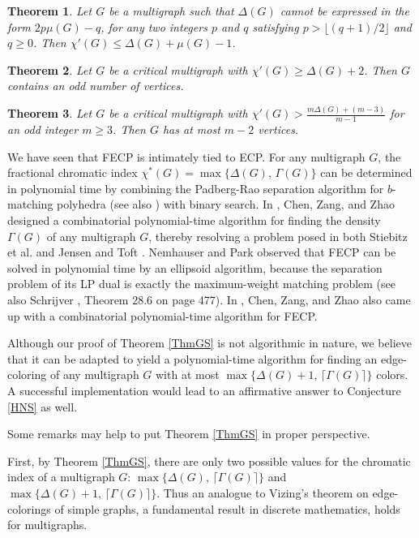 \documentclass[11pt]{article}
\newtheorem{theorem}{Theorem}[section]
\begin{document}
\begin{theorem} \label{ThmGupta67} 
Let $G$ be a multigraph such that $\Delta(G)$ cannot be expressed in the form $2p\mu(G)-q$,
for any two integers $p$ and $q$ satisfying $p > \lfloor (q+1)/2 \rfloor$ and $q \ge 0$. Then 
$\chi'(G)\le \Delta(G)+\mu(G)-1$. 
\end{theorem}

\begin{theorem} \label{ThmAnd0} 
Let $G$ be a critical multigraph with $\chi'(G) \ge \Delta(G)+2$. Then $G$ contains an odd number of
vertices.
\end{theorem}

\begin{theorem} \label{ThmAnd} 
Let $G$ be a critical multigraph with $\chi'(G)>\frac{m \Delta(G)+(m-3)}{m-1}$ for an odd 
integer $m \ge 3$. Then $G$ has at most $m-2$ vertices.
\end{theorem}

We have seen that FECP is intimately tied to ECP. For any multigraph $G$, the fractional chromatic index 
$\chi^*(G)=\max\{\Delta(G), \,\Gamma(G) \}$ can be determined in polynomial time 
by combining the Padberg-Rao separation algorithm for $b$-matching polyhedra \cite{PR} (see also \cite{LRT, PW}) with 
binary search. In \cite{CZZ}, Chen, Zang, and Zhao designed a combinatorial polynomial-time algorithm for finding 
the density $\Gamma(G)$ of any multigraph $G$, thereby resolving a problem posed in both Stiebitz et al. \cite{SSTF} 
and Jensen and Toft \cite{JT}. Nemhauser and Park \cite{NP} observed that FECP can be solved in polynomial 
time by an ellipsoid algorithm, because the separation problem of its LP dual is exactly the maximum-weight 
matching problem (see also Schrijver \cite{Sc}, Theorem 28.6 on page 477). In \cite{CZZ}, 
Chen, Zang, and Zhao also came up with a combinatorial polynomial-time algorithm for FECP.
 
Although our proof of Theorem \ref{ThmGS} is not algorithmic in nature, we believe that it can be adapted to 
yield a polynomial-time algorithm for finding an edge-coloring of any multigraph $G$ with at most 
$\max\{\Delta(G)+1, \, \lceil \Gamma(G) \rceil\}$ colors. A successful implementation would lead to an 
affirmative answer to Conjecture \ref{HNS} as well. 

Some remarks may help to put Theorem \ref{ThmGS} in proper perspective. 

First, by Theorem \ref{ThmGS}, there are only two possible values for the chromatic index of a multigraph $G$: 
$\max\{\Delta(G), \, \lceil \Gamma(G) \rceil\}$ and  $\max\{\Delta(G)+1, \, \lceil \Gamma(G) \rceil\}$. Thus an 
analogue to Vizing's theorem on edge-colorings of simple graphs, a fundamental result in discrete mathematics, holds for 
multigraphs.
\end{document}
